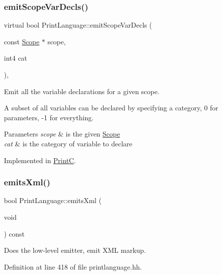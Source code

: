\subsubsection{\texorpdfstring{emitScopeVarDecls()}{emitScopeVarDecls()}}
{\footnotesize\ttfamily virtual bool Print\+Language\+::emit\+Scope\+Var\+Decls (\begin{DoxyParamCaption}\item[{const \mbox{\hyperlink{class_scope}{Scope}} $\ast$}]{scope,  }\item[{int4}]{cat }\end{DoxyParamCaption})\hspace{0.3cm}{\ttfamily [protected]}, {}}



Emit all the variable declarations for a given scope. 

A subset of all variables can be declared by specifying a category, 0 for parameters, -\/1 for everything. 
\begin{DoxyParams}{Parameters}
{\em scope} & is the given \mbox{\hyperlink{class_scope}{Scope}} \\
\hline
{\em cat} & is the category of variable to declare \\
\hline
\end{DoxyParams}


Implemented in \mbox{\hyperlink{class_print_c_af3fcfeca02664799789cf4042956ee26}{PrintC}}.

\mbox{\label{class_print_language_a3a95b637e8095b550d81cbda9b25f9b1}} 
\subsubsection{\texorpdfstring{emitsXml()}{emitsXml()}}
{\footnotesize\ttfamily bool Print\+Language\+::emits\+Xml (\begin{DoxyParamCaption}\item[{void}]{ }\end{DoxyParamCaption}) const\hspace{0.3cm}{\ttfamily [inline]}}



Does the low-\/level emitter, emit X\+ML markup. 



Definition at line 418 of file printlanguage.\+hh.

